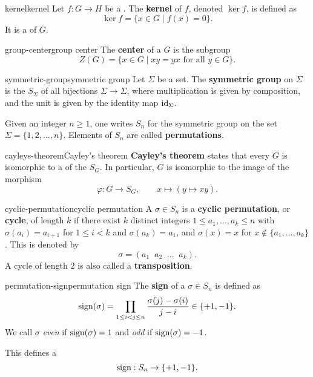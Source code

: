 \begin{topic}{kernel}{kernel}
    Let $f : G \to H$ be a . The \textbf{kernel} of $f$, denoted $\ker f$, is defined as
    \[ \ker f = \{ x \in G \mid f(x) = 0 \} . \]
    It is a   of $G$.
\end{topic}

\begin{topic}{group-center}{group center}
    The \textbf{center} of a  $G$ is the subgroup
    \[ Z(G) = \{ x \in G \mid xy = yx \text{ for all } y \in G \} . \]
\end{topic}

\begin{topic}{symmetric-group}{symmetric group}
    Let $\Sigma$ be a set. The \textbf{symmetric group} on $\Sigma$ is the  $S_\Sigma$ of all bijections $\Sigma \to \Sigma$, where multiplication is given by composition, and the unit is given by the identity map $\textup{id}_\Sigma$.
    
    Given an integer $n \ge 1$, one writes $S_n$ for the symmetric group on the set $\Sigma = \{ 1, 2, \ldots, n \}$. Elements of $S_n$ are called \textbf{permutations}.
\end{topic}

\begin{topic}{cayleys-theorem}{Cayley's theorem}
    \textbf{Cayley's theorem} states that every  $G$ is isomorphic to a  of the  $S_G$. In particular, $G$ is isomorphic to the image of the morphism
    \[ \varphi : G \to S_G, \qquad x \mapsto (y \mapsto xy) . \]
\end{topic}

\begin{topic}{cyclic-permutation}{cyclic permutation}
    A  $\sigma \in S_n$ is a \textbf{cyclic permutation}, or \textbf{cycle}, of length $k$ if there exist $k$ distinct integers $1 \le a_1, \ldots, a_k \le n$ with $\sigma(a_i) = a_{i + 1}$ for $1 \le i < k$ and $\sigma(a_k) = a_1$, and $\sigma(x) = x$ for $x \not\in \{ a_1, \ldots, a_k \}$. This is denoted by
    \[ \sigma = (a_1 \;\; a_2 \;\; \ldots \;\; a_k) . \]
    A cycle of length $2$ is also called a \textbf{transposition}.
\end{topic}

\begin{topic}{permutation-sign}{permutation sign}
    The \textbf{sign} of a  $\sigma \in S_n$ is defined as
    \[ \textup{sign}(\sigma) = \prod_{1 \le i < j \le n} \frac{\sigma(j) - \sigma(i)}{j - i} \in \{ +1, -1 \} . \]
    We call $\sigma$ \textit{even} if $\textup{sign}(\sigma) = 1$ and \textit{odd} if $\textup{sign}(\sigma) = -1$.
    
    This defines a 
    \[ \textup{sign} : S_n \to \{ +1, -1 \} . \]
\end{topic}


